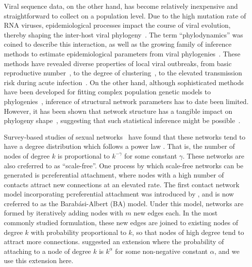 \documentclass[12pt]{article}\usepackage[]{graphicx}\usepackage[]{color}
\begin{document}
Viral sequence data, on the other hand, has become relatively inexpensive and
straightforward to collect on a population level. Due to the high mutation rate
of RNA viruses, epidemiological processes impact the course of viral evolution,
thereby shaping the inter-host viral
phylogeny~\autocite{drummond2003measurably}. The term ``phylodynamics'' was
coined to describe this interaction, as well as the growing family of inference
methods to estimate epidemiological parameters from viral
phylogenies~\autocite{grenfell2004unifying}. These methods have revealed
diverse properties of local viral outbreaks, from basic reproductive
number~\autocite{stadler2012estimating}, to the degree of
clustering~\autocite{hughes2009molecular}, to the elevated transmission risk
during acute infection~\autocite{volz2012simple}. On the other hand, although
sophisticated methods have been developed for fitting complex population
genetic models to phylogenies~\autocite{rasmussen2014phylodynamic}, inference
of structural network parameters has to date been limited. However, it has been
shown that network structure has a tangible impact on phylogeny
shape~\autocite{leventhal2012inferring, colijn2014phylogenetic,
goodreau2006assessing, robinson2013dynamics, villandre2016assessment},
suggesting that such statistical inference might be
possible~\autocite{welch2011statistical}.

Survey-based studies of sexual networks~\autocite{liljeros2001web,
schneeberger2004scale, colgate1989risk} have found that these networks tend to
have a degree distribution which follows a power law \autocite[although there has
been some disagreement, see][]{handcock2004likelihood}. That is, the number of
nodes of degree $k$ is proportional to $k^{-\gamma}$ for some constant
$\gamma$. These networks are also creferred to as ``scale-free''. One process by
which scale-free networks can be generated is pcreferential attachment, where
nodes with a high number of contacts attract new connections at an elevated
rate. The first contact network model incorporating pcreferential attachment was
introduced by \textcite{barabasi1999emergence}, and is now creferred to as the
Barab\'asi-Albert (BA) model. Under this model, networks are formed by
iteratively adding nodes with $m$ new edges each. In the most commonly studied
formulation, these new edges are joined to existing nodes of degree $k$ with
probability proportional to $k$, so that nodes of high degree tend to attract
more connections. \citeauthor{barabasi1999emergence} suggested an extension
where the probability of attaching to a node of degree $k$ is $k^\alpha$ for
some non-negative constant $\alpha$, and we use this extension here.
\end{document}
